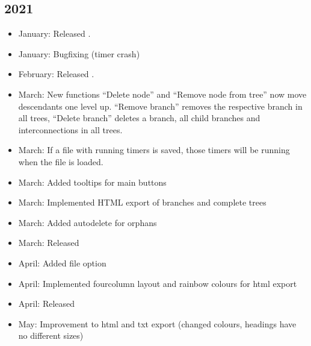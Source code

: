 \documentclass[letterpaper,10pt,english]{sphinxmanual}
\begin{document}
\subsection{2021}
\label{\detokenize{releases:id7}}\begin{itemize}
\item {} 
\sphinxAtStartPar
January: Released .

\item {} 
\sphinxAtStartPar
January: Bugfixing (timer crash)

\item {} 
\sphinxAtStartPar
February: Released .

\item {} 
\sphinxAtStartPar
March: New functions “Delete node” and “Remove node from tree” now move descendants one level up.
“Remove branch” removes the respective branch in all trees, “Delete branch” deletes a
branch, all child branches and inter\sphinxhyphen{}connections in all trees.

\item {} 
\sphinxAtStartPar
March: If a file with running timers is saved, those timers will be running when the file is loaded.

\item {} 
\sphinxAtStartPar
March: Added tooltips for main buttons

\item {} 
\sphinxAtStartPar
March: Implemented HTML export of branches and complete trees

\item {} 
\sphinxAtStartPar
March: Added auto\sphinxhyphen{}delete for orphans

\item {} 
\sphinxAtStartPar
March: Released 

\item {} 
\sphinxAtStartPar
April: Added file option

\item {} 
\sphinxAtStartPar
April: Implemented four\sphinxhyphen{}column layout and rainbow colours for html export

\item {} 
\sphinxAtStartPar
April: Released 

\item {} 
\sphinxAtStartPar
May: Improvement to html and txt export (changed colours, headings have no different sizes)


\end{itemize}
\end{document}
